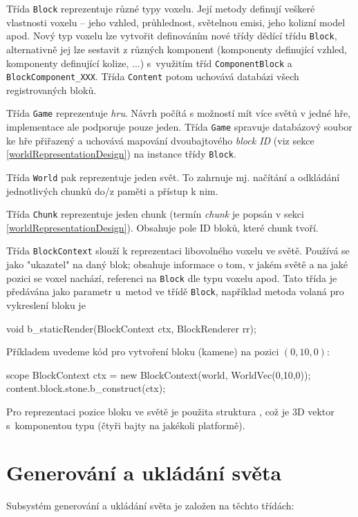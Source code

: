 Třída \texttt{Block} reprezentuje různé typy voxelu. Její metody definují veškeré vlastnosti voxelu -- jeho vzhled, průhlednost, světelnou emisi, jeho kolizní model apod. Nový typ voxelu lze vytvořit definováním nové třídy dědící třídu \texttt{Block}, alternativně jej lze sestavit z různých komponent (komponenty definující vzhled, komponenty definující kolize, ...) s~využitím tříd \texttt{ComponentBlock} a \texttt{BlockComponent\_XXX}. Třída \texttt{Content} potom uchovává databázi všech registrovaných bloků.

Třída \texttt{Game} reprezentuje \textit{hru}. Návrh počítá s možností mít více světů v jedné hře, implementace ale podporuje pouze jeden. Třída \texttt{Game} spravuje databázový soubor ke hře přiřazený a uchovává mapování dvoubajtového \textit{block ID} (viz sekce \ref{worldRepresentationDesign}) na instance třídy \texttt{Block}.

Třída \texttt{World} pak reprezentuje jeden svět. To zahrnuje mj. načítání a odkládání jednotlivých chunků do/z paměti a přístup k nim.

Třída \texttt{Chunk} reprezentuje jeden chunk (termín \textit{chunk} je popsán v sekci \ref{worldRepresentationDesign}). Obsahuje pole ID bloků, které chunk tvoří.

Třída \texttt{BlockContext} slouží k reprezentaci libovolného voxelu ve světě. Používá se jako "ukazatel" na daný blok; obsahuje informace o tom, v jakém světě a na jaké pozici se voxel nachází, referenci na \texttt{Block} dle typu voxelu apod. Tato třída je předávána jako parametr u~metod ve třídě \texttt{Block}, například metoda volaná pro vykreslení bloku je
\begin{dcode}
	void b_staticRender(BlockContext ctx, BlockRenderer rr);
\end{dcode}\vspace{0mm}
Příkladem uvedeme kód pro vytvoření bloku (kamene) na pozici $(0,10,0)$:
\begin{dcode}
	scope BlockContext ctx = new BlockContext(world, WorldVec(0,10,0));
	content.block.stone.b_construct(ctx);
\end{dcode}
Pro reprezentaci pozice bloku ve světě je použita struktura , což je 3D vektor s~komponentou typu  (čtyři bajty na jakékoli platformě).

\section{Generování a ukládání světa}
Subsystém generování a ukládání světa je založen na těchto třídách:

